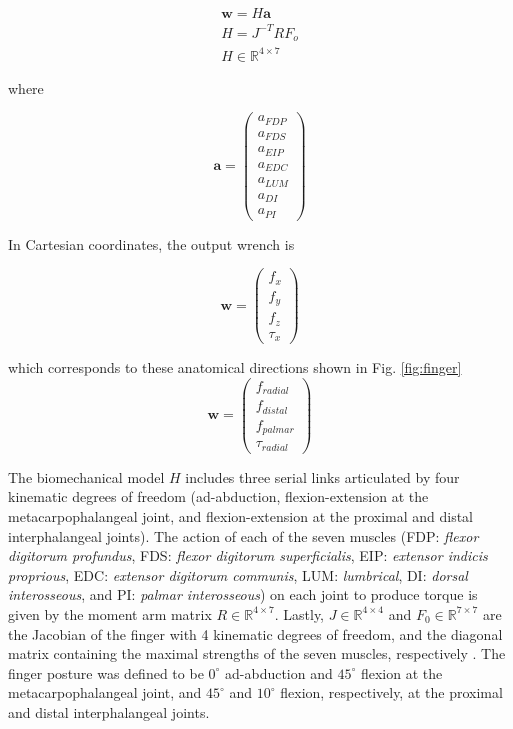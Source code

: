 \documentclass[10pt,letterpaper]{article}
\begin{document}
\begin{eqnarray}
\textbf{w} = H  \textbf{a} \\
H=J^{-T}RF_o  \\
H \in \mathbb{R}^{4 \times 7} 
\end{eqnarray}

where 

\begin{equation}
\label{eq:a}
\textbf{a}= 
\begin{pmatrix}
a_{FDP}\\
a_{FDS}\\
a_{EIP}\\
a_{EDC}\\
a_{LUM}\\
a_{DI}\\
a_{PI}
\end{pmatrix}
\end{equation}

In Cartesian coordinates, the output wrench is

\begin{equation}
\label{eq:wc}
\textbf{w}= 
\begin{pmatrix}
f_{x}\\
f_{y}\\
f_{z}\\
\tau_{x}
\end{pmatrix}
\end{equation}

which corresponds to these anatomical directions shown in Fig. \ref{fig:finger}
\begin{equation}
\label{eq:wa}
\textbf{w}= 
\begin{pmatrix}
f_{radial}\\
f_{distal}\\
f_{palmar}\\
\tau_{radial}
\end{pmatrix}
\end{equation}

The biomechanical model $H$ includes three serial links articulated by four kinematic degrees of freedom (ad-abduction, flexion-extension at the metacarpophalangeal joint, and flexion-extension at the proximal and distal interphalangeal joints). The action of each of the seven muscles (FDP: \emph{flexor digitorum profundus}, FDS: \emph{flexor digitorum superficialis}, EIP: \emph{extensor indicis proprious}, EDC: \emph{extensor digitorum communis}, LUM: \emph{lumbrical}, DI: \emph{dorsal interosseous}, and PI: \emph{palmar interosseous}) on each joint to produce torque is given by the moment arm matrix $R \in \mathbb{R}^{4 \times 7}$. Lastly, $J \in \mathbb{R}^{4 \times 4}$ and $F_0 \in \mathbb{R}^{7 \times 7}$ are the Jacobian of the finger with 4 kinematic degrees of freedom, and the diagonal  matrix containing the maximal strengths of the seven muscles, respectively \cite{Valero-Cuevas1998Large,valero-cuevas2015fundamentals,Valero-Cuevas2000Scaling}. The finger posture was defined to be $0^\circ$  ad-abduction and $45^\circ$ flexion at the metacarpophalangeal joint, and $45^\circ$ and $10^\circ$ flexion, respectively, at the proximal and distal interphalangeal joints.
\end{document}
